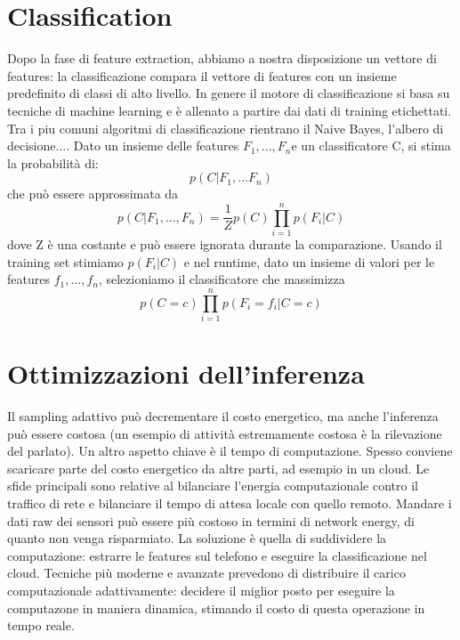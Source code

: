 \section{Classification}
Dopo la fase di feature extraction, abbiamo a nostra disposizione un vettore di
features: la classificazione compara il vettore di features con un insieme
predefinito di classi di alto livello. In genere il motore di classificazione si
basa su tecniche di machine learning e è allenato a partire dai dati di training
etichettati. Tra i piu comuni algoritmi di classificazione rientrano il Naive
Bayes, l'albero di decisione....
\bigbreak
Dato un insieme delle features $F_1, ..., F_n$e un classificatore C, si stima la
probabilità di:
\begin{equation}
p(C|F_1, ...F_n)
\end{equation}
che può essere approssimata da
\begin{equation}
p(C|F_1,...,F_n)=\frac{1}{Z}p(C)\prod_{i=1}^{n}p(F_i|C)
\end{equation}
dove Z è una costante e può essere ignorata durante la comparazione. Usando il
training set stimiamo $p(F_i|C)$ e nel runtime, dato un insieme di valori per le
features $f_1, ..., f_n$, selezioniamo il classificatore che massimizza
\begin{equation}
p(C=c)\prod_{i=1}^{n}p(F_i=f_i|C=c)
\end{equation}

\section{Ottimizzazioni dell'inferenza}
Il sampling adattivo può decrementare il costo energetico, ma anche l'inferenza
può essere costosa (un esempio di attività estremamente costosa è la
rilevazione del parlato). Un altro aspetto chiave è il tempo di computazione.
Spesso conviene scaricare parte del costo energetico da altre parti, ad esempio
in un cloud.
Le sfide principali sono relative al bilanciare l'energia computazionale contro
il traffico di rete e bilanciare il tempo di attesa locale con quello remoto.
Mandare i dati raw dei sensori può essere più costoso in termini di network
energy, di quanto non venga risparmiato. La soluzione è quella di suddividere la
computazione: estrarre le features sul telefono e eseguire la classificazione
nel cloud. Tecniche più moderne e avanzate prevedono di distribuire il carico
computazionale adattivamente: decidere il miglior posto per eseguire la
computazone in maniera dinamica, stimando il costo di questa operazione in tempo
reale.
